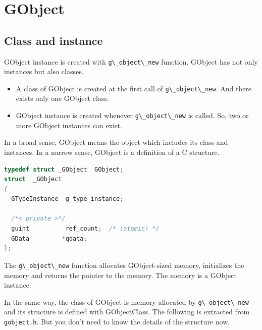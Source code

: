 \section{GObject}\label{gobject}

\subsection{Class and instance}\label{class-and-instance}

GObject instance is created with
\passthrough{\lstinline!g\_object\_new!} function. GObject has not only
instances but also classes.

\begin{itemize}
\tightlist
\item
  A class of GObject is created at the first call of
  \passthrough{\lstinline!g\_object\_new!}. And there exists only one
  GObject class.
\item
  GObject instance is created whenever
  \passthrough{\lstinline!g\_object\_new!} is called. So, two or more
  GObject instances can exist.
\end{itemize}

In a broad sense, GObject means the object which includes its class and
instances. In a narrow sense, GObject is a definition of a C structure.

\begin{lstlisting}[language=C]
typedef struct _GObject  GObject;
struct  _GObject
{
  GTypeInstance  g_type_instance;
  
  /*< private >*/
  guint          ref_count;  /* (atomic) */
  GData         *qdata;
};
\end{lstlisting}

The \passthrough{\lstinline!g\_object\_new!} function allocates
GObject-sized memory, initializes the memory and returns the pointer to
the memory. The memory is a GObject instance.

In the same way, the class of GObject is memory allocated by
\passthrough{\lstinline!g\_object\_new!} and its structure is defined
with GObjectClass. The following is extracted from
\passthrough{\lstinline!gobject.h!}. But you don't need to know the
details of the structure now.

